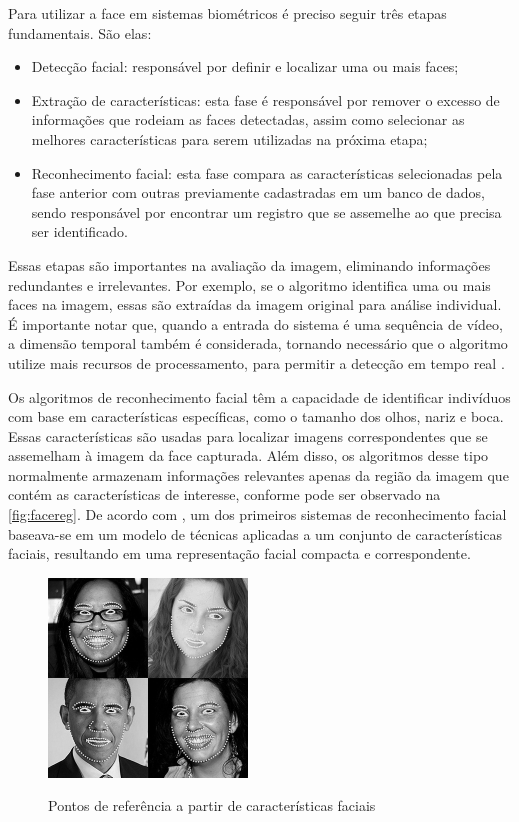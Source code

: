 Para utilizar a face em sistemas biométricos é preciso seguir três
etapas fundamentais. São elas:

\begin{itemize}
    \item Detecção facial: responsável por definir e localizar uma ou mais
    faces;

    \item Extração de características: esta fase é responsável por remover o excesso de
    informações que rodeiam as faces detectadas, assim como selecionar as melhores
    características para serem utilizadas na próxima etapa;

    \item Reconhecimento facial: esta fase compara as características selecionadas pela fase
    anterior com outras previamente cadastradas em um banco de dados, sendo
    responsável por encontrar um registro que se assemelhe ao que precisa ser
    identificado.

\end{itemize}

Essas etapas são importantes na avaliação da imagem, eliminando informações 
redundantes e irrelevantes. Por exemplo, se o algoritmo identifica uma ou mais faces na 
imagem, essas são extraídas da imagem original para análise individual. É importante 
notar que, quando a entrada do sistema é uma sequência de vídeo, a dimensão temporal 
também é considerada, tornando necessário que o algoritmo utilize mais recursos de 
processamento, para permitir a detecção em tempo real \cite[p. 44]{boechat2008}.

Os algoritmos de reconhecimento facial têm a capacidade de identificar indivíduos com 
base em características específicas, como o tamanho dos olhos, nariz e boca. Essas 
características são usadas para localizar imagens correspondentes que se assemelham 
à imagem da face capturada. Além disso, os algoritmos desse tipo normalmente armazenam 
informações relevantes apenas da região da imagem que contém as características de 
interesse, conforme pode ser observado na \autoref{fig:facereg}. De acordo 
com \cite[p. 6]{brunelli1993}, um dos primeiros sistemas de reconhecimento 
facial baseava-se em um modelo de técnicas aplicadas a um conjunto de características 
faciais, resultando em uma representação facial compacta e correspondente.

\begin{figure}[h!]
    \centering
    \caption{Pontos de referência a partir de características faciais}
    \includegraphics[scale=0.8]{figuras/facereg.jpg}
    \label{fig:facereg}
    \centering
\end{figure}

